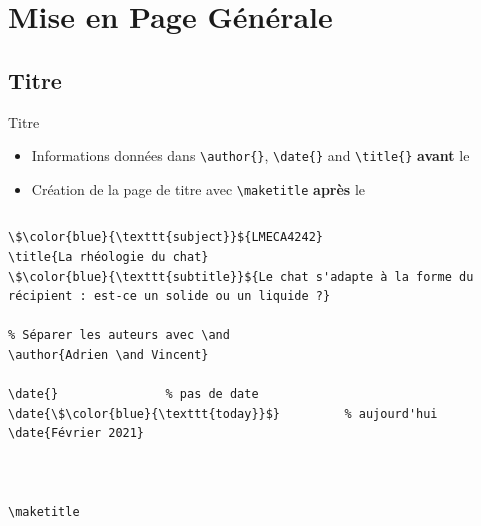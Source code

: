 \section{Mise en Page Générale}

\subsection{Titre}

\begin{frame}[fragile]{Titre}
  \begin{itemize}
      \item Informations données dans \lstinline|\author{}|, \lstinline|\date{}| and \lstinline|\title{}| \textbf{avant} le \lstinline||
      \item Création de la page de titre avec \lstinline|\maketitle| \textbf{après} le \lstinline||
  \end{itemize}
  \begin{columns}
    \begin{column}{0.5\textwidth}
      \begin{lstlisting}[style=nonumbers,mathescape]
\$\color{blue}{\texttt{subject}}${LMECA4242}
\title{La rhéologie du chat}
\$\color{blue}{\texttt{subtitle}}${Le chat s'adapte à la forme du récipient : est-ce un solide ou un liquide ?}

% Séparer les auteurs avec \and
\author{Adrien \and Vincent}

\date{}               % pas de date
\date{\$\color{blue}{\texttt{today}}$}         % aujourd'hui
\date{Février 2021}



\maketitle



\end{lstlisting}
\end{column}
\end{columns}
\end{frame}

